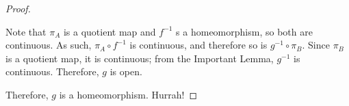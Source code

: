 \begin{proof}
\begin{itemize}
		Note that $\pi_A$ is a quotient map and $f^{-1}$ s a homeomorphism, so both are continuous. As such, $\pi_A\circ f^{-1}$ is continuous, and therefore so is $g^{-1}\circ \pi_B$. Since $\pi_B$ is a quotient map, it is continuous; from the Important Lemma, $g^{-1}$ is continuous. Therefore, $g$ is open. 
	\end{itemize}
	Therefore, $g$ is a homeomorphism. Hurrah! 
\end{proof}
